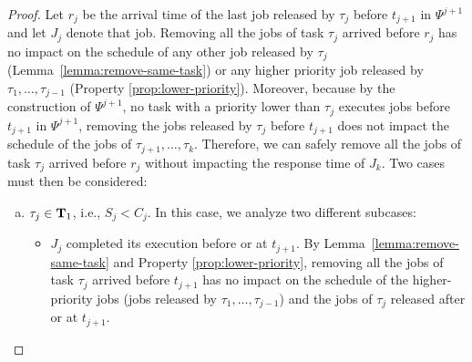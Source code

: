 \begin{proof}
Let $r_j$ be the arrival time of the last job released by $\tau_j$ before $t_{j+1}$ in $\Psi^{j+1}$ and let $J_{j}$ denote that job. %
Removing all the jobs of task $\tau_j$ arrived before $r_j$ has no impact on the schedule of any other job released by $\tau_j$ (Lemma~\ref{lemma:remove-same-task}) or any higher priority job released by $\tau_1, \ldots, \tau_{j-1}$ (Property \ref{prop:lower-priority}). Moreover, because by the construction of $\Psi^{j+1}$, no task with a priority lower than $\tau_j$ executes jobs before $t_{j+1}$ in $\Psi^{j+1}$, removing the jobs released by $\tau_j$ before $t_{j+1}$ does not impact the schedule of the jobs of $\tau_{j+1}, \ldots, \tau_{k}$. Therefore, we can safely remove all the jobs of task $\tau_j$ arrived before $r_j$ without impacting the response time of $J_{k}$. Two cases must then be considered:
\begin{enumerate}[(a)]
\item $\tau_j \in {\bf T}_1$, i.e., $S_j < C_j$. In this case, we analyze two different subcases:
\begin{itemize}
\item $J_{j}$ completed its execution before or at $t_{j+1}$. By Lemma~\ref{lemma:remove-same-task} and Property \ref{prop:lower-priority}, removing all the jobs of task $\tau_j$ arrived before $t_{j+1}$ has no impact on the schedule of the higher-priority jobs (jobs released by $\tau_1, \ldots, \tau_{j-1}$) and the jobs of $\tau_j$ released after or at $t_{j+1}$. 

\end{itemize}
\end{enumerate}
\end{proof}
